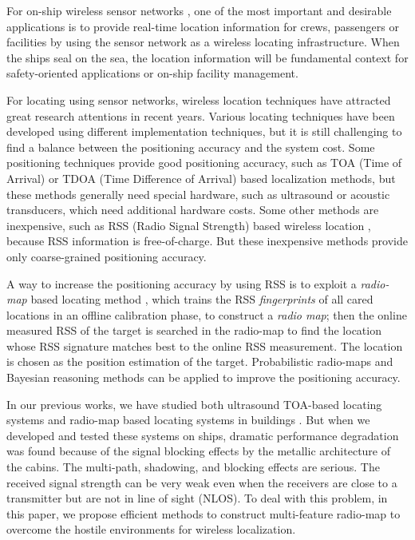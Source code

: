 \documentclass[conference, 10pt]{IEEEtran}
\begin{document}
For on-ship wireless sensor networks \cite{paik_characteristics_2009,  kdouh_double_2013,mu_hybrid_2012}, one of the most important and desirable applications is to provide real-time location information for crews, passengers or facilities by using the sensor network as a wireless locating infrastructure. When the ships seal on the sea, the location information will be fundamental context for safety-oriented applications or on-ship facility management.  

For locating using sensor networks, wireless location techniques have attracted great research attentions in recent years. Various locating techniques have been developed using  different implementation techniques, but it is still challenging to find a balance between the positioning accuracy and the system cost. Some positioning techniques provide good positioning accuracy, such as TOA (Time of Arrival) \cite{zhao_autonomous_2008} or TDOA (Time Difference of Arrival)\cite{gustafsson_positioning_2003} based localization methods, but these methods generally need special hardware, such as ultrasound or acoustic transducers, which need additional hardware costs. Some other methods are inexpensive, such as RSS (Radio Signal Strength) based wireless location \cite{el-kafrawy_propagation_2010}, because RSS information is free-of-charge. But these inexpensive methods provide only coarse-grained  positioning accuracy.  

A way to increase the positioning accuracy by using RSS is to exploit a \emph{radio-map} based locating method \cite{haque_profiling-based_2013, scholl_fast_2012}, which trains the RSS \emph{fingerprints} of all cared locations in an offline calibration phase,  to construct a \emph{radio map};  then the online measured RSS of the target is searched in the radio-map to find the location whose RSS signature matches best to the online RSS measurement. The location is chosen as the position estimation of the target. Probabilistic radio-maps and Bayesian reasoning methods can be applied to improve the positioning accuracy. 

In our previous works, we have studied both ultrasound TOA-based locating systems \cite{zhao_autonomous_2008, wang_lock:_2009} and radio-map based locating systems in buildings \cite{zheng_hips:_2009}. But when we developed and tested these systems on ships, dramatic performance degradation was found because of the signal blocking effects by the metallic architecture of the cabins. The multi-path,  shadowing, and blocking effects are serious.  The received signal strength can be very weak even when the receivers are close to a transmitter but are not in line of sight (NLOS).  To deal with this problem, in this paper, we propose efficient methods to construct multi-feature radio-map to overcome the hostile environments for wireless localization.  
\end{document}
